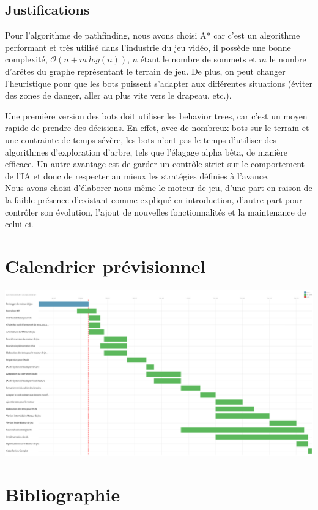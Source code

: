\documentclass[french]{article}
\begin{document}
\subsection{Justifications}

Pour l'algorithme de pathfinding, nous avons choisi A* car c'est un algorithme performant et très utilisé dans l'industrie du jeu vidéo, il possède une bonne complexité, $\mathcal{O}(n + m\ log(n))$, $n$ étant le nombre de sommets et $m$ le nombre d'arêtes du graphe représentant le terrain de jeu. De plus, on peut changer l'heuristique pour que les bots puissent s'adapter aux différentes situations (éviter des zones de danger, aller au plus vite vers le drapeau, etc.). \newline

Une première version des bots doit utiliser les behavior trees, car c'est un moyen rapide de prendre des décisions. En effet, avec de nombreux bots sur le terrain et une contrainte de temps sévère, les bots n'ont pas le temps d'utiliser des algorithmes d'exploration d'arbre, tels que l'élagage alpha bêta, de manière efficace. Un autre avantage est de garder un contrôle strict sur le comportement de l'IA et donc de respecter au mieux les stratégies définies à l'avance.\\

Nous avons choisi d'élaborer nous même le moteur de jeu, d'une part en raison de la faible présence d'existant comme expliqué en introduction, d'autre part pour contrôler son évolution, l'ajout de nouvelles fonctionnalités et la maintenance de celui-ci.
\newline

\section{Calendrier prévisionnel}

\centerline{\includegraphics[scale=0.3]{data/gantt.png}}


\section{Bibliographie}

\printbibliography[heading=none]
\nocite{*}
\end{document}
